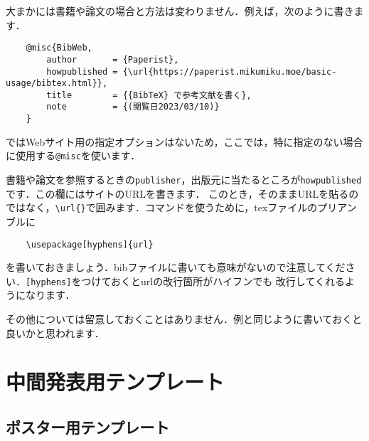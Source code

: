 \documentclass[a4paper,11pt]{ltjsreport}
\numberwithin{equation}{section}
\theoremstyle{definition}
\begin{document}
大まかには書籍や論文の場合と方法は変わりません．例えば，次のように書きます\cite{BibWeb}．
\begin{verbatim}
    @misc{BibWeb,
        author       = {Paperist},
        howpublished = {\url{https://paperist.mikumiku.moe/basic-usage/bibtex.html}},
        title        = {{BibTeX} で参考文献を書く},
        note         = {(閲覧日2023/03/10)}
    }
\end{verbatim}

{\BibTeX}ではWebサイト用の指定オプションはないため，ここでは，特に指定のない場合に使用する\verb|@misc|を使います．

書籍や論文を参照するときの\verb|publisher|，出版元に当たるところが\verb|howpublished|です．この欄にはサイトのURLを書きます．
このとき，そのままURLを貼るのではなく，\verb|\url{}|で囲みます．コマンドを使うために，texファイルのプリアンブルに
\begin{verbatim}
    \usepackage[hyphens]{url}
\end{verbatim}
を書いておきましょう．bibファイルに書いても意味がないので注意してください．\verb|[hyphens]|をつけておくとurlの改行箇所がハイフンでも
改行してくれるようになります．

その他については留意しておくことはありません．例と同じように書いておくと良いかと思われます．



\chapter{中間発表用テンプレート}


\section{ポスター用テンプレート}
\end{document}
